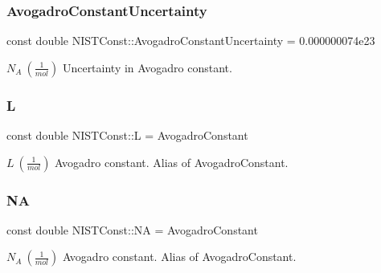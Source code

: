 \subsubsection{\texorpdfstring{Avogadro\+Constant\+Uncertainty}{AvogadroConstantUncertainty}}
{\footnotesize\ttfamily const double N\+I\+S\+T\+Const\+::\+Avogadro\+Constant\+Uncertainty = 0.\+000000074e23}

$N_A \ (\frac{1}{mol})$ Uncertainty in Avogadro constant. \mbox{\label{group___avogadro_constant_ga0d410e47da7c9d6841958899d80e4b75}} 
\subsubsection{\texorpdfstring{L}{L}}
{\footnotesize\ttfamily const double N\+I\+S\+T\+Const\+::L = Avogadro\+Constant}

$L \ (\frac{1}{mol})$ Avogadro constant. Alias of Avogadro\+Constant. \mbox{\label{group___avogadro_constant_gad08af58ac1b1ee41e25bd8564a74bc42}} 
\subsubsection{\texorpdfstring{NA}{NA}}
{\footnotesize\ttfamily const double N\+I\+S\+T\+Const\+::\+NA = Avogadro\+Constant}

$N_A \ (\frac{1}{mol})$ Avogadro constant. Alias of Avogadro\+Constant. 